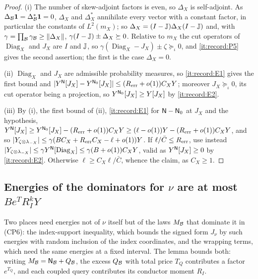 \begin{proof}
(i) The number of skew-adjoint factors is even, so $\Delta_X$ is
self-adjoint. As $\Delta_\mathcal B\mathbf 1=\Delta_\mathcal B^*\mathbf 1=0$, $\Delta_X$ and $\Delta_X^*$
annihilate every vector with a constant factor, in particular the constants
of $L^2(m_X)$; so $\Delta_X=(I-\mathbb J)\Delta_X(I-\mathbb J)$ and, with
$\gamma=\prod_\mathcal B\gamma_\mathcal B\ge\|\Delta_X\|$,
$\gamma(I-\mathbb J)\pm\Delta_X\succeq0$. Relative to $m_X$ the cut operators of
$\operatorname{Diag}_X$ and $J_X$ are $I$ and $\mathbb J$, so
$\gamma(\operatorname{Diag}_X-J_X)\pm\zeta\succeq_\iota0$, and
\ref{it:record:P5} gives the second assertion; the first is the case
$\Delta_X=0$.

(ii) $\operatorname{Diag}_X$ and $J_X$ are admissible probability measures, so
\ref{it:record:E1} gives the first bound and
$|Y^{\mathsf N}[J_X]-Y^{\mathsf N_0}[J_X]|\le(R_{\rm err}+o(1))C_XY$; moreover
$J_X\succeq_\iota0$, its cut operator being a projection, so
$Y^{\mathsf N_0}[J_X]\ge Y[J_X]$ by \ref{it:record:E2}.

(iii) By (i), the first bound of (ii), \ref{it:record:E1} for
$\mathsf N-\mathsf N_0$ at $J_X$ and the hypothesis,
$Y^{\mathsf N}[J_X]\ge Y^{\mathsf N_0}[J_X]-(R_{\rm err}+o(1))C_XY\ge(\ell-o(1))Y
-(R_{\rm err}+o(1))C_XY$, and so
$|Y_{\zeta\otimes\lambda_{-X}}|\le\gamma(BC_X+R_{\rm err}C_X-\ell+o(1))Y$. If
$\ell/\bar C\le R_{\rm err}$, use instead $|Y_{\zeta\otimes\lambda_{-X}}|\le\gamma
Y^{\mathsf N}[\operatorname{Diag}_X]\le\gamma(B+o(1))C_XY$, valid as
$Y^{\mathsf N}[J_X]\ge0$ by \ref{it:record:E2}. Otherwise $\ell\ge C_X\ell/\bar C$,
whence the claim, as $C_X\ge1$.
\end{proof}

\subsection{Energies of the dominators for \texorpdfstring{$\nu$}{nu} are at most \texorpdfstring{$Be^TR_I^kY$}{B e\textasciicircum T R\_I\textasciicircum k Y}}

Two places need energies not of $\nu$ itself but of the laws
$M_\mathcal B$ that dominate it in (CP6): the index-support inequality,
which bounds the signed form $J_\nu$ by such energies with random
inclusion of the index coordinates, and the wrapping terms, which
need the same energies at a fixed interval. The lemma bounds both:
writing $M_\mathcal B=\mathsf N_\mathcal B+Q_\mathcal B$, the excess $Q_\mathcal B$ with total
price $T_Q$ contributes a factor $e^{T_Q}$, and each coupled query
contributes its conductor moment $R_I$.

